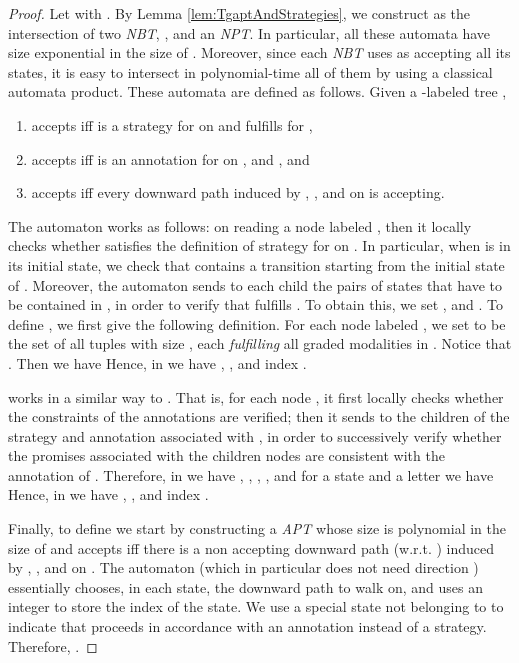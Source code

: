 \documentclass{LMCS}
\theoremstyle{plain}
\def \NBT           {\emph{NBT}\xspace}
\def \NPT           {\emph{NPT}\xspace}
\def \TAPT          {\emph{APT}\xspace}
\begin{document}
\begin{proof}
Let  with . By Lemma \ref{lem:TgaptAndStrategies}, we
construct  as the intersection of two \NBT , , and
an \NPT . In particular, all these automata have size
exponential in the size of . Moreover, since each \NBT uses as
accepting all its states, it is easy to intersect in
polynomial-time all of them by using a classical automata product.
These automata are defined as follows. Given a -labeled
tree ,
\begin{enumerate}[(1)]
\item
 accepts  iff  is a strategy for  on
 and  fulfills  for ,

\item
 accepts  iff  is an annotation for  on
,  and , and

\item
 accepts  iff every downward path induced by ,
, and  on  is accepting.
\end{enumerate}

The automaton 
works as follows: on reading a node  labeled , then it locally checks whether  satisfies
the definition of strategy for  on . In particular,
when  is in its initial state, we check that  contains
a transition starting from the initial state of . Moreover,
the automaton  sends to each child  the pairs of
states that have to be contained in , in order
to verify that  fulfills . To obtain this, we set
,  and
. To define , we first give the
following definition. For each node  labeled , we set {\small
    }
to be the set of all tuples with size , each
\emph{fulfilling} all graded modalities in . Notice
that . Then we have {\small
    }
\noindent Hence, in  we have , , and index .

 works in a
similar way to . That is, for each node , it first locally
checks whether the constraints of the annotations are verified;
then it sends to the children of  the strategy and annotation
associated with , in order to successively verify whether the
promises associated with the children nodes are consistent with
the annotation of . Therefore, in  we have , , , , and for a state  and a letter  we
have {\small
    }
Hence, in  we have ,
, and index .

Finally, to define  we start by constructing a \TAPT 
whose size is polynomial in the size of  and accepts
 iff there is a non accepting
downward path (w.r.t. ) induced by , , and
 on . The automaton  (which in particular does not need
direction ) essentially chooses, in each state, the downward
path to walk on, and uses an integer to store the index of the
state. We use a special state  not belonging to  to
indicate that  proceeds in accordance with an annotation
instead of a strategy. Therefore, .


\end{proof}
\end{document}
